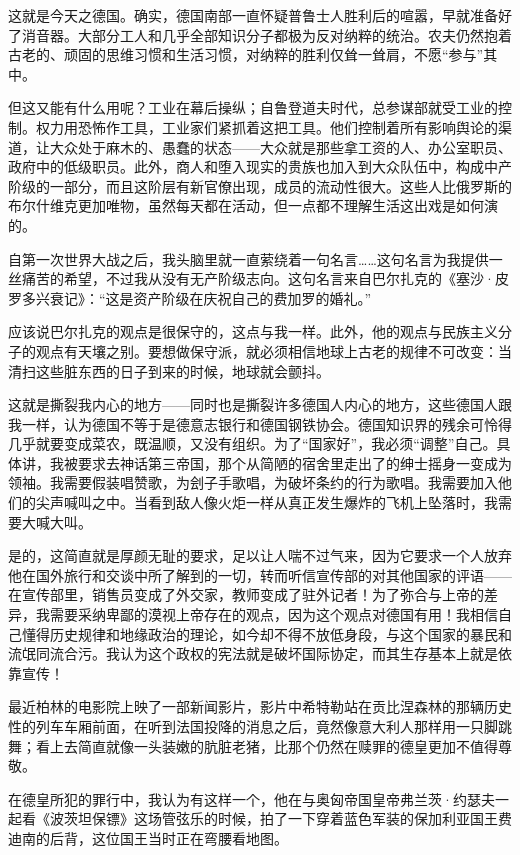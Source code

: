\documentclass[UTF8]{ctexart}
\begin{document}
这就是今天之德国。确实，德国南部一直怀疑普鲁士人胜利后的喧嚣，早就准备好了消音器。大部分工人和几乎全部知识分子都极为反对纳粹的统治。农夫仍然抱着古老的、顽固的思维习惯和生活习惯，对纳粹的胜利仅耸一耸肩，不愿“参与”其中。

但这又能有什么用呢？工业在幕后操纵；自鲁登道夫时代，总参谋部就受工业的控制。权力用恐怖作工具，工业家们紧抓着这把工具。他们控制着所有影响舆论的渠道，让大众处于麻木的、愚蠢的状态——大众就是那些拿工资的人、办公室职员、政府中的低级职员。此外，商人和堕入现实的贵族也加入到大众队伍中，构成中产阶级的一部分，而且这阶层有新官僚出现，成员的流动性很大。这些人比俄罗斯的布尔什维克更加唯物，虽然每天都在活动，但一点都不理解生活这出戏是如何演的。

自第一次世界大战之后，我头脑里就一直萦绕着一句名言……这句名言为我提供一丝痛苦的希望，不过我从没有无产阶级志向。这句名言来自巴尔扎克的《塞沙·皮罗多兴衰记》：“这是资产阶级在庆祝自己的费加罗的婚礼。”

应该说巴尔扎克的观点是很保守的，这点与我一样。此外，他的观点与民族主义分子的观点有天壤之别。要想做保守派，就必须相信地球上古老的规律不可改变：当清扫这些脏东西的日子到来的时候，地球就会颤抖。

这就是撕裂我内心的地方——同时也是撕裂许多德国人内心的地方，这些德国人跟我一样，认为德国不等于是德意志银行和德国钢铁协会。德国知识界的残余可怜得几乎就要变成菜农，既温顺，又没有组织。为了“国家好”，我必须“调整”自己。具体讲，我被要求去神话第三帝国，那个从简陋的宿舍里走出了的绅士摇身一变成为领袖。我需要假装唱赞歌，为刽子手歌唱，为破坏条约的行为歌唱。我需要加入他们的尖声喊叫之中。当看到敌人像火炬一样从真正发生爆炸的飞机上坠落时，我需要大喊大叫。

是的，这简直就是厚颜无耻的要求，足以让人喘不过气来，因为它要求一个人放弃他在国外旅行和交谈中所了解到的一切，转而听信宣传部的对其他国家的评语——在宣传部里，销售员变成了外交家，教师变成了驻外记者！为了弥合与上帝的差异，我需要采纳卑鄙的漠视上帝存在的观点，因为这个观点对德国有用！我相信自己懂得历史规律和地缘政治的理论，如今却不得不放低身段，与这个国家的暴民和流氓同流合污。我认为这个政权的宪法就是破坏国际协定，而其生存基本上就是依靠宣传！

最近柏林的电影院上映了一部新闻影片，影片中希特勒站在贡比涅森林的那辆历史性的列车车厢前面，在听到法国投降的消息之后，竟然像意大利人那样用一只脚跳舞；看上去简直就像一头装嫩的肮脏老猪，比那个仍然在赎罪的德皇更加不值得尊敬。

在德皇所犯的罪行中，我认为有这样一个，他在与奥匈帝国皇帝弗兰茨·约瑟夫一起看《波茨坦保镖》这场管弦乐的时候，拍了一下穿着蓝色军装的保加利亚国王费迪南的后背，这位国王当时正在弯腰看地图。
\end{document}

